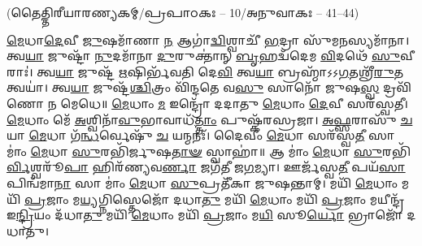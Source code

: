 
\vspace{-1ex}
\centerline{\scriptsize (𑌤𑍈𑌤𑍍𑌤𑌿𑌰𑍀𑌯𑌾𑌰𑌣𑍍𑌯𑌕𑌮𑍍/𑌪𑍍𑌰𑌪𑌾𑌠𑌕𑌃 – 10/𑌅𑌨𑍁𑌵𑌾𑌕𑌃 – 41–44)}

\-\ul{𑌮𑍇}\-𑌧𑌾\-\ul{𑌦𑍇}\-𑌵𑍀 \ul{𑌜𑍁}\-𑌷𑌮𑌾᳴𑌣𑌾 \ul{𑌨} 𑌆𑌗𑌾॑\-\ul{𑌦𑍍𑌵𑌿}\-𑌶𑍍𑌵𑌾𑌚𑍀᳴ \ul{𑌭}\-𑌦𑍍𑌰𑌾 𑌸𑍁᳴𑌮\-\ul{𑌨}\-𑌸𑍍𑌯𑌮𑌾᳴𑌨𑌾। 𑌤𑍍𑌵\-\ul{𑌯𑌾} 𑌜𑍁𑌷𑍍𑌟𑌾᳴ \ul{𑌨𑍁}\-𑌦𑌮𑌾᳴𑌨𑌾 \ul{𑌦𑍁}\-𑌰𑍁𑌕𑍍𑌤𑌾॑𑌨𑍍 \ul{𑌬𑍃}\-𑌹𑌦𑍍𑌵᳴𑌦𑍇𑌮 \ul{𑌵𑌿}\-𑌦𑌥𑍇᳴ \ul{𑌸𑍁}\-𑌵𑍀𑌰𑌾𑌃॑। 𑌤𑍍𑌵\-\ul{𑌯𑌾} 𑌜𑍁𑌷𑍍𑌟᳴ \ul{𑌋}\-𑌷𑌿𑌰𑍍𑌭᳴𑌵𑌤𑌿 𑌦𑍇\-\ul{𑌵𑌿} 𑌤𑍍𑌵\-\ul{𑌯𑌾} 𑌬𑍍𑌰𑌹𑍍𑌮𑌾᳴𑌽𑌽\-\ul{𑌗}\-𑌤𑌶𑍍𑌰𑍀᳴\-\ul{𑌰𑍁}\-𑌤 𑌤𑍍𑌵𑌯𑌾॑। 𑌤𑍍𑌵\-\ul{𑌯𑌾} 𑌜𑍁𑌷𑍍𑌟᳴\-\ul{𑌶𑍍𑌚𑌿}\-𑌤𑍍𑌰𑌂 𑌵𑌿᳴𑌨𑍍𑌦𑌤𑍇 𑌵\-\ul{𑌸𑍁} 𑌸𑌾𑌨𑍋᳴ 𑌜𑍁𑌷\-\ul{𑌸𑍍𑌵} 𑌦𑍍𑌰𑌵𑌿᳴𑌣𑍋 𑌨 𑌮𑍇𑌧𑍇॥ 
\-\ul{𑌮𑍇}\-𑌧𑌾𑌂 \ul{𑌮} 𑌇𑌨𑍍𑌦𑍍𑌰𑍋᳴ 𑌦𑌦𑌾𑌤𑍁 \ul{𑌮𑍇}\-𑌧𑌾𑌂 \ul{𑌦𑍇}\-𑌵𑍀 𑌸𑌰᳴𑌸𑍍𑌵𑌤𑍀। \ul{𑌮𑍇}\-𑌧𑌾𑌂 𑌮𑍇᳴ \ul{𑌅}\-𑌶𑍍𑌵𑌿𑌨𑌾᳴\-\ul{𑌵𑍁}\-𑌭𑌾𑌵𑌾𑌧᳴\-\ul{𑌤𑍍𑌤𑌾𑌂} 𑌪𑍁𑌷𑍍𑌕᳴𑌰𑌸𑍍𑌰𑌜𑌾। \ul{𑌅}\-\-\ul{𑌫𑍍𑌸}\-𑌰𑌾𑌸𑍁᳴ \ul{𑌚} 𑌯𑌾 \ul{𑌮𑍇}\-𑌧𑌾 𑌗᳴\-\ul{𑌨𑍍𑌧}\-𑌰𑍍𑌵𑍇𑌷𑍁᳴ \ul{𑌚} 𑌯𑌨𑍍𑌮𑌨𑌃᳴। 𑌦𑍈𑌵𑍀𑌂॑ \ul{𑌮𑍇}\-𑌧𑌾 𑌸𑌰᳴𑌸𑍍𑌵\-\ul{𑌤𑍀} 𑌸𑌾 𑌮𑌾𑌂॑ \ul{𑌮𑍇}\-𑌧𑌾 \ul{𑌸𑍁}\-𑌰𑌭𑌿᳴𑌰𑍍𑌜𑍁𑌷\-\ul{𑌤𑌾}\-\-\ul{𑍟} 𑌸𑍍𑌵𑌾𑌹𑌾॑॥ 
𑌆 𑌮𑌾𑌂॑ \ul{𑌮𑍇}\-𑌧𑌾 \ul{𑌸𑍁}\-𑌰𑌭𑌿᳴\-\ul{𑌰𑍍𑌵𑌿}\-𑌶𑍍𑌵𑌰𑍂᳴\-\ul{𑌪𑌾} 𑌹𑌿𑌰᳴𑌣𑍍𑌯𑌵\-\ul{𑌰𑍍𑌣𑌾} 𑌜𑌗᳴𑌤𑍀 𑌜\-\ul{𑌗}\-𑌮𑍍𑌯𑌾। 𑌊𑌰𑍍𑌜᳴𑌸𑍍𑌵\-\ul{𑌤𑍀} 𑌪𑌯᳴\-\ul{𑌸𑌾} 𑌪𑌿𑌨𑍍𑌵᳴𑌮𑌾\-\ul{𑌨𑌾} 𑌸𑌾 𑌮𑌾𑌂॑ \ul{𑌮𑍇}\-𑌧𑌾 \ul{𑌸𑍁}\-𑌪𑍍𑌰𑌤𑍀᳴𑌕𑌾 𑌜𑍁𑌷𑌨𑍍𑌤𑌾𑌮𑍍। 𑌮𑌯𑌿᳴ \ul{𑌮𑍇}\-𑌧𑌾𑌂 𑌮𑌯𑌿᳴ \ul{𑌪𑍍𑌰}\-𑌜𑌾𑌂 𑌮\-\ul{𑌯𑍍𑌯}\-𑌗𑍍𑌨𑌿𑌸𑍍𑌤𑍇𑌜𑍋᳴ 𑌦𑌧𑌾\-\ul{𑌤𑍁} 𑌮𑌯𑌿᳴ \ul{𑌮𑍇}\-𑌧𑌾𑌂 𑌮𑌯𑌿᳴ \ul{𑌪𑍍𑌰}\-𑌜𑌾𑌂 𑌮𑌯𑍀𑌨𑍍𑌦𑍍𑌰᳴ 𑌇\-\ul{𑌨𑍍𑌦𑍍𑌰𑌿}\-𑌯𑌂 𑌦᳴𑌧𑌾\-\ul{𑌤𑍁} 𑌮𑌯𑌿᳴ \ul{𑌮𑍇}\-𑌧𑌾𑌂 𑌮𑌯𑌿᳴ \ul{𑌪𑍍𑌰}\-𑌜𑌾𑌂 𑌮\-\ul{𑌯𑌿} 𑌸𑍂\-\ul{𑌰𑍍𑌯𑍋} 𑌭𑍍𑌰𑌾𑌜𑍋᳴ 𑌦𑌧𑌾𑌤𑍁। 



